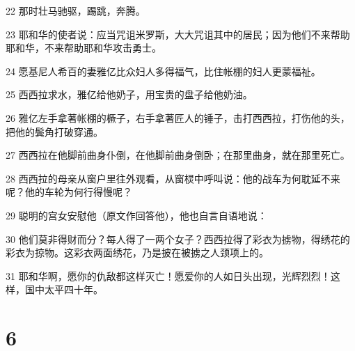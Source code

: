 \par 22 那时壮马驰驱，踢跳，奔腾。
\par 23 耶和华的使者说：应当咒诅米罗斯，大大咒诅其中的居民；因为他们不来帮助耶和华，不来帮助耶和华攻击勇士。
\par 24 愿基尼人希百的妻雅亿比众妇人多得福气，比住帐棚的妇人更蒙福祉。
\par 25 西西拉求水，雅亿给他奶子，用宝贵的盘子给他奶油。
\par 26 雅亿左手拿著帐棚的橛子，右手拿著匠人的锤子，击打西西拉，打伤他的头，把他的鬓角打破穿通。
\par 27 西西拉在他脚前曲身仆倒，在他脚前曲身倒卧；在那里曲身，就在那里死亡。
\par 28 西西拉的母亲从窗户里往外观看，从窗棂中呼叫说：他的战车为何耽延不来呢？他的车轮为何行得慢呢？
\par 29 聪明的宫女安慰他（原文作回答他），他也自言自语地说：
\par 30 他们莫非得财而分？每人得了一两个女子？西西拉得了彩衣为掳物，得绣花的彩衣为掠物。这彩衣两面绣花，乃是披在被掳之人颈项上的。
\par 31 耶和华啊，愿你的仇敌都这样灭亡！愿爱你的人如日头出现，光辉烈烈！这样，国中太平四十年。

\chapter{6}

